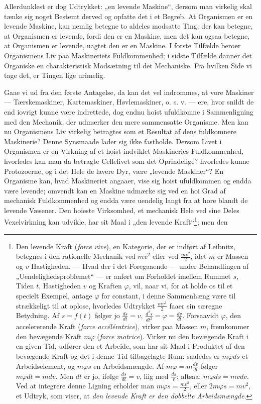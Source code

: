\documentclass[11pt]{book}
\newcommand{\opage}[1]{\marginnote{\footnotesize\textit{[#1]}}}
\begin{document}
Allerdunklest er dog Udtrykket: „en levende Maskine“, dersom man
virkelig skal tænke sig noget Bestemt derved og opfatte det i et Begreb.
At Organismen er en levende Maskine, kan nemlig betegne to aldeles
modsatte Ting: der kan betegne, at Organismen er levende, fordi den er en
\opage{351} \setcounter{footnote}{0}%
Maskine, men det kan ogsaa betegne, at Organismen er levende, uagtet
den er en Maskine. I forste Tilfælde beroer Organismens Liv paa
Maskineriets Fuldkommenhed; i sidste Tilfælde danner det Organiske en
charakteristisk Modsætning til det Mechaniske. Fra hvilken Side vi tage
det, er Tingen lige urimelig.

Gaae vi ud fra den første Antagelse, da kan det vel indrommes, at
vore Maskiner --- Tærskemaskiner, Kartemaskiner, Høvlemaskiner, o. s. v.
--- ere, hvor snildt de end iovrigt kunne være indrettede, dog endnu
hoist ufuldkomne i Sammenligning med den Mechanik, der udmærker
den mere sammensatte Organisme. Men kan nu Organismens Liv
virkelig betragtes som et Resultat af dens fuldkomnere Maskinerie? Denne
Synsmaade lader sig ikke fastholde. Dersom Livet i Organismen er en
Virkning af et hoist indviklet Maskineries Fuldkommenhed, hvorledes
kan man da betragte Cellelivet som det Oprindelige? hvorledes kunne
Protozoerne, og i det Hele de lavere Dyr, være „levende Maskiner“? En
Organisme kan, hvad Maskineriet angaaer, vise sig hoist ufuldkommen
og endda være levende; omvendt kan en Maskine udmærke sig ved en
hoi Grad af mechanisk Fuldkommenhed og endda være uendelig langt
fra at hore blandt de levende Væsener. Den hoieste Virksomhed, et
mechanisk Hele ved sine Deles Vexelvirkning kan udvikle, har sit Maal
i „den levende Kraft“\footnote{Den levende Kraft (\textit{force vive}), en
Kategorie, der er indført af Leibnitz, betegnes i den rationelle Mechanik ved
$mv^2$ eller ved $\frac{mv^2}{2}$, idet $m$ er Massen og $v$ Hastigheden.
--- Hvad der i det Foregaaende --- under Behandlingen af
„Uendelighedsproblemet“ --- er anført om Forholdet imellem Rummet $s$, Tiden
$t$, Hastigheden $v$ og Kraften $\varphi$, vil, naar vi, for at holde os til et
specielt Exempel, antage $\varphi$ for constant, i denne Sammenhæng være
til\-%
strækkeligt til at oplose, hvorledes Udtrykket $\frac{mv^2}{2}$ faaer sin
særegne Betydning. Af $s = f(t)$ følger jo $\frac{ds}{dt} = v$,
$\frac{d^2s}{dt^2} = \varphi = \frac{dv}{dt}$. Forsaavidt $\varphi$, den
accelererende Kraft (\textit{force accélératrice}), virker paa Massen $m$,
fremkommer den bevægende Kraft $m\varphi$ (\textit{force motrice}). Virker nu
den bevægende Kraft i en given Tid, udfører den et Arbeide, som har sit
Maal i Produktet af den bevægende Kraft og det i denne Tid tilbagelagte
Rum: saaledes er $m\varphi ds$ et Arbeidselement, og $m\varphi s$ en
Arbeidsmængde. Af $m\varphi = m\frac{dv}{dt}$ følger $m\varphi dt = mdv$. Men
$dt$ er jo, ifølge $\frac{ds}{dt} = v$, liig med $\frac{ds}{v}$; altsaa:
$m\varphi ds = mvdv$. Ved at integrere denne Ligning erholder man
$m\varphi s = \frac{mv^2}{2}$, eller $2m\varphi s = mv^2$, et Udtryk, som
viser, at \emph{den levende Kraft er den dobbelte Arbeidsmængde}.}; men den
\end{document}
